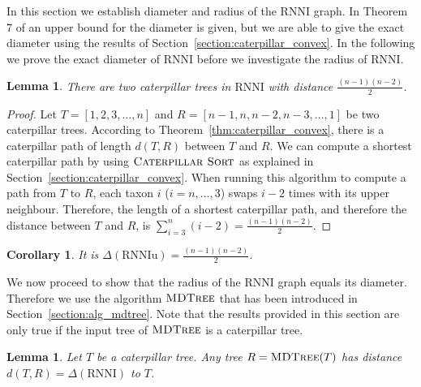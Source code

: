 \documentclass{amsart}
\newcommand{\rnni}{\mathrm{RNNI}}
\newcommand{\rnniu}{\mathrm{RNNIu}}
\newcommand{\csort}{\textsc{Caterpillar Sort}}
\newcommand{\mdtree}{\textsc{MDTree}}
\newtheorem{lemma}[definition]{Lemma}
\newtheorem{corollary}[definition]{Corollary}
\begin{document}
In this section we establish diameter and radius of the $\rnni$ graph.
In Theorem 7 of \autocite{Gavryushkin2018-ol} an upper bound for the diameter is given, but we are able to give the exact diameter using the results of Section~\ref{section:caterpillar_convex}.
In the following we prove the exact diameter of $\rnni$ before we investigate the radius of $\rnni$.

\begin{lemma}
There are two caterpillar trees in $\rnni$ with distance $\frac{(n-1)(n-2)}{2}$.
\label{lemma:caterpillar_diameter}
\end{lemma}

\begin{proof}
Let $T = [1,2,3,\ldots,n]$ and $R = [n-1,n,n-2,n-3, \ldots, 1]$ be two caterpillar trees.
According to Theorem~\ref{thm:caterpillar_convex}, there is a caterpillar path of length $d(T,R)$ between $T$ and $R$.
We can compute a shortest caterpillar path by using $\csort$ as explained in Section~\ref{section:caterpillar_convex}.
When running this algorithm to compute a path from $T$ to $R$, each taxon $i$ ($i = n, \ldots, 3$) swaps $i-2$ times with its upper neighbour.
Therefore, the length of a shortest caterpillar path, and therefore the distance between $T$ and $R$, is $\sum\limits_{i=3}^{n}(i-2)  = \frac{(n-1)(n-2)}{2}$.
\end{proof}

\begin{corollary}
It is $\Delta(\rnniu) = \frac{(n-1)(n-2)}{2}$.
\label{corollary:diameter}
\end{corollary}

We now proceed to show that the radius of the $\rnni$ graph equals its diameter.
Therefore we use the algorithm $\mdtree$ that has been introduced in Section~\ref{section:alg_mdtree}.
Note that the results provided in this section are only true if the input tree of $\mdtree$ is a caterpillar tree.

\begin{lemma}
Let $T$ be a caterpillar tree.
Any tree $R = \mdtree(T)$ has distance $d(T,R) = \Delta(\rnni)$ to $T$.
\label{lemma:max_dist_caterpillar}
\end{lemma}
\end{document}
